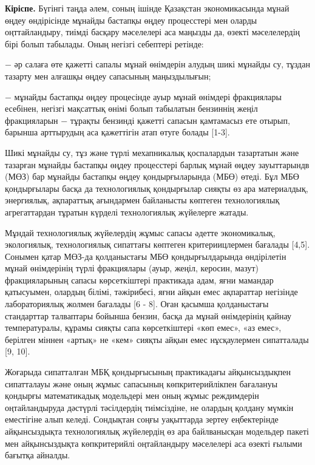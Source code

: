 \begin{multicols}{2}
{\bfseries Кіріспе.} Бүгінгі таңда әлем, соның ішінде Қазақстан
экономикасында мұнай өңдеу өндірісінде мұнайды бастапқы өңдеу
процесстері мен оларды оңттайландыру, тиімді басқару мәселелері аса
маңызды да, өзекті мәселелердің бірі болып табылады. Оның негізгі
себептері ретінде:

− әр салаға өте қажетті сапалы мұнай өнімдерін алудың шикі мұнайды су,
тұздан тазарту мен алғашқы өңдеу сапасының маңыздылығын;

− мұнайды бастапқы өңдеу процесінде ауыр мұнай өнімдері фракциялары
есебінен, негізгі мақсаттық өнімі болып табылатын бензиннің жеңіл
фракцияларын − тұрақты бензинді қажетті сапасын қамтамасыз ете отырып,
барынша арттырудың аса қажеттігін атап өтуге болады {[}1-3{]}.

Шикі мұнайды су, тұз және түрлі мехапникалық қоспалардын тазартатын және
тазарған мұнайды бастапқы өңдеу процесстері барлық мұнай өңдеу
зауыттарындв (МӨЗ) бар мұнайды бастапқы өңдеу қондырғыларында (МБӨ)
өтеді. Бұл МБӨ қондырғылары басқа да технологиялық қондырғылар сияқты өз
ара материалдық, энергиялық, ақпараттық ағындармен байланысты көптеген
технологиялық агрегаттардан тұратын күрделі технологиялық жүйелерге
жатады.

Мұндай технологиялық жүйелердің жұмыс сапасы әдетте экономикалық,
экологиялық, технологиялық сипаттағы көптеген критериицлермен бағалады
{[}4,5{]}. Сонымен қатар МӨЗ-да қолданыстағы МБӨ қондырғылдарында
өндірілетін мұнай өнімдерінің түрлі фракциялары (ауыр, жеңіл, керосин,
мазут) фракцияларының сапасы көрсеткіштері практикада адам, яғни
мамандар қатысуымен, олардың білімі, тәжірибесі, яғни айқын емес
ақпараттар негізінде лабораториялық жолмен бағалады {[}6 - 8{]}. Оған
қасымша қолданыстағы стандарттар талваптары бойынша бензин, басқа да
мұнай өнімдерінің қайнау температуралы, құрамы сияқты сапа көрсеткіштері
«көп емес», «аз емес», берілген міннен «артық» не «кем» сияқты айқын
емес нұсқаулермен сипатталады {[}9, 10{]}.

Жоғарыда сипатталған МБҚ қондырғысының практикадағы айқынсыздықпен
сипатталауы және оның жұмыс сапасының көпкритерийлікпен бағалануы
қондырғы математикадық модельдері мен оның жұмыс реждимдерін
оңтайландыруда дәстүрлі тәсілдердің тиімсіздіне, не олардың қолдану
мүмкін еместігіне алып келеді. Сондықтан соңғы уақыттарда зертеу
еңбектерінде айқынсыздықта технологиялық жүйелердің өз ара байлванысқан
модельдер пакеті мен айқынсыздықта көпкритерийлі оңтайландыру мәселелері
аса өзекті ғылыми бағытқа айналды.


\end{multicols}
